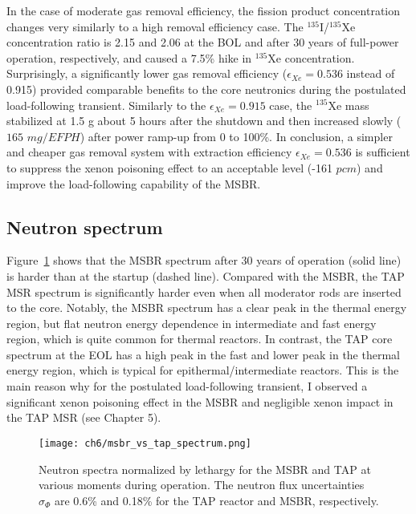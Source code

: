 In the case of moderate gas removal efficiency, the fission product 
concentration changes very similarly to a high removal efficiency case. The 
$^{135}$I/$^{135}$Xe concentration ratio is 2.15 and 2.06 at the \gls{BOL} and 
after 30 years of full-power operation, respectively, and caused a 7.5\% hike 
in $^{135}$Xe concentration. Surprisingly, a significantly lower gas removal 
efficiency ($\epsilon_{Xe}=0.536$ instead of 0.915) provided comparable 
benefits to the core neutronics during the postulated load-following 
transient. Similarly to the $\epsilon_{Xe}=0.915$ case, the 
$^{135}$Xe mass stabilized at 1.5 g about 5 hours after the shutdown and 
then increased slowly ($165$ $mg/EFPH$) after power ramp-up from 0 to 100\%.
In conclusion, a simpler and cheaper gas removal system with extraction 
efficiency $\epsilon_{Xe}=0.536$ is sufficient to suppress the xenon 
poisoning effect to an acceptable level (-161 $pcm$) and improve the 
load-following capability of the \gls{MSBR}.


\subsection{Neutron spectrum}
Figure~\ref{fig:ch6-msbr-spectrum} shows that the \gls{MSBR} spectrum after 30 
years of operation (solid line) is harder than at the startup (dashed line). 
Compared with the \gls{MSBR}, the \gls{TAP} \gls{MSR} spectrum is 
significantly harder even when all moderator rods are inserted to the core. 
Notably, the \gls{MSBR} spectrum has a clear peak in the thermal energy 
region, but flat neutron energy dependence in intermediate and fast energy 
region, which is quite common for thermal reactors. In contrast, the \gls{TAP} 
core spectrum at the \gls{EOL} has a high peak in the fast and lower peak in 
the thermal energy region, which is typical for epithermal/intermediate 
reactors. This is the main reason why for the postulated load-following 
transient, I observed a significant xenon poisoning effect in the \gls{MSBR} 
and negligible xenon impact in the \gls{TAP} \gls{MSR} (see Chapter 5).
\begin{figure}[htbp!] %
	\centering
	\texttt{[image: ch6/msbr\_vs\_tap\_spectrum.png]}
	\caption{Neutron spectra normalized by lethargy for the \gls{MSBR} and 
		\gls{TAP} at various moments during operation. The neutron flux 
		uncertainties $\sigma_{\Phi}$ are 0.6\% and 0.18\% for the \gls{TAP} 
		reactor and \gls{MSBR}, respectively.}
	\label{fig:ch6-msbr-spectrum}
\end{figure}

